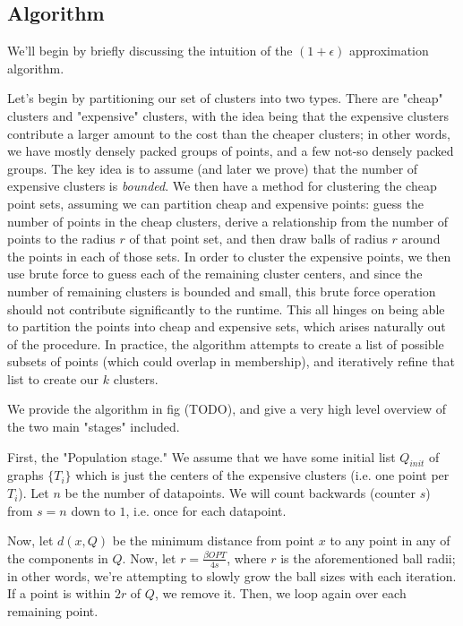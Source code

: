 \documentclass[paper=a4, fontsize=10.5pt]{scrartcl} %
\numberwithin{equation}{section} %
\numberwithin{figure}{section} %
\numberwithin{table}{section} %
\begin{document}


\subsection{Algorithm}
We'll begin by briefly discussing the intuition of the $(1 + \epsilon)$ approximation algorithm.

Let's begin by partitioning our set of clusters into two types.  There are  "cheap" clusters and "expensive" clusters, with the idea being that the expensive clusters contribute a larger amount to the cost than the cheaper clusters; in other words, we have mostly densely packed groups of points, and a few not-so densely packed groups.  The key idea is to assume (and later we prove) that the number of expensive clusters is \emph{bounded}.  We then have a method for clustering the cheap point sets, assuming we can partition cheap and expensive points: guess the number of points in the cheap clusters, derive a relationship from the number of points to the radius $r$ of that point set, and then draw balls of radius $r$ around the points in each of those sets.  In order to cluster the expensive points, we then use brute force to guess each of the remaining cluster centers, and since the number of remaining clusters is bounded and small, this brute force operation should not contribute significantly to the runtime.  This all hinges on being able to partition the points into cheap and expensive sets, which arises naturally out of the procedure.  In practice, the algorithm attempts to create a list of possible subsets of points (which could overlap in membership), and iteratively refine that list to create our $k$ clusters. 



We provide the algorithm in fig (TODO), and give a very high level overview of the two main "stages" included.

First, the "Population stage."  We assume that we have some initial list $Q_{init}$ of graphs $\{T_i\}$ which is just the centers of the expensive clusters (i.e. one point per $T_i$).  Let $n$ be the number of datapoints.  We will count backwards (counter $s$) from $s=n$ down to $1$, i.e. once for each datapoint.

Now, let $d(x, Q)$ be the minimum distance from point $x$ to any point in any of the components in $Q$.  Now, let $r = \frac{\beta OPT}{4 s}$, where $r$ is the aforementioned ball radii; in other words, we're attempting to slowly grow the ball sizes with each iteration.  If a point is within $2r$ of $Q$, we remove it. Then, we loop again over each remaining point.
\end{document}
